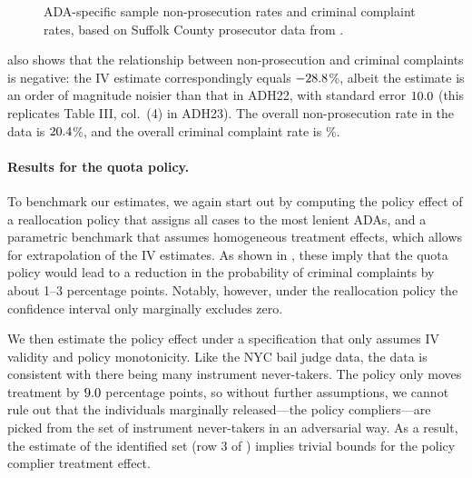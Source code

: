 \documentclass[12pt]{article}%
\theoremstyle{definition}
\newcommand\1{\operatorname{I}\indicatorfence}
\begin{document}
\begin{figure}[tp]
{\centering
{\small}
\caption{ADA-specific sample non-prosecution rates and criminal complaint rates,
  based on Suffolk County prosecutor data from
  \textcite{adh23}.}\label{fig:suffolk_raw}}
\end{figure}

 also shows that the relationship between non-prosecution
and criminal complaints is negative: the IV estimate correspondingly equals
$-28.8$\%, albeit the estimate is an order of magnitude noisier than that in
ADH22, with standard error $10.0$ (this replicates Table III, col.~(4) in
ADH23). The overall non-prosecution rate in the data is $20.4$\%, and the
overall criminal complaint rate is \sufEY\%.

\paragraph{Results for the quota policy.}

To benchmark our estimates, we again start out by computing the policy effect of
a reallocation policy that assigns all cases to the most lenient ADAs\@, and a
parametric benchmark that assumes homogeneous treatment effects, which allows for
extrapolation of the IV estimates. As shown in , these
imply that the quota policy would lead to a reduction in the probability of criminal complaints by about 1--3 percentage points. Notably, however, under the
reallocation policy the confidence interval only marginally excludes zero.

We then estimate the policy effect under a specification that only assumes
\ac{IV} validity and policy monotonicity. Like the NYC bail judge data, the data
is consistent with there being many instrument never-takers. The policy only
moves treatment by $9.0$ percentage points, so without further
assumptions, we cannot rule out that the individuals marginally released---the
policy compliers---are picked from the set of instrument never-takers in an
adversarial way. As a result, the estimate of the identified set (row 3 of
) implies trivial bounds for the policy complier
treatment effect.
\end{document}
